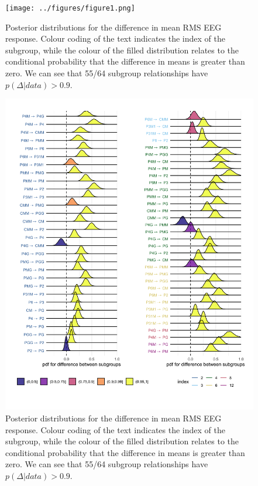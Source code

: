 \documentclass[9pt,twocolumn,twoside,lineno]{pnas-new}
\begin{document}
\begin{figure}%
\centering
\texttt{[image: ../figures/figure1.png]}
\caption{Posterior distributions for the difference in mean RMS EEG response. Colour coding of the text indicates the index of the subgroup, while the colour of the filled distribution relates to the conditional probability that the difference in means is greater than zero. We can see that 55/64 subgroup relationships have $p(\Delta|data)>0.9$.}
\label{fig:durations_rotations}
\end{figure}

\begin{figure}%
\centering
\includegraphics[width=1\linewidth]{../analysis/plots/subgroup_comprms_Occ_Odd.png}
\caption{Posterior distributions for the difference in mean RMS EEG response. Colour coding of the text indicates the index of the subgroup, while the colour of the filled distribution relates to the conditional probability that the difference in means is greater than zero. We can see that 55/64 subgroup relationships have $p(\Delta|data)>0.9$.}
\label{fig:durations_rotations}
\end{figure}
\end{document}

